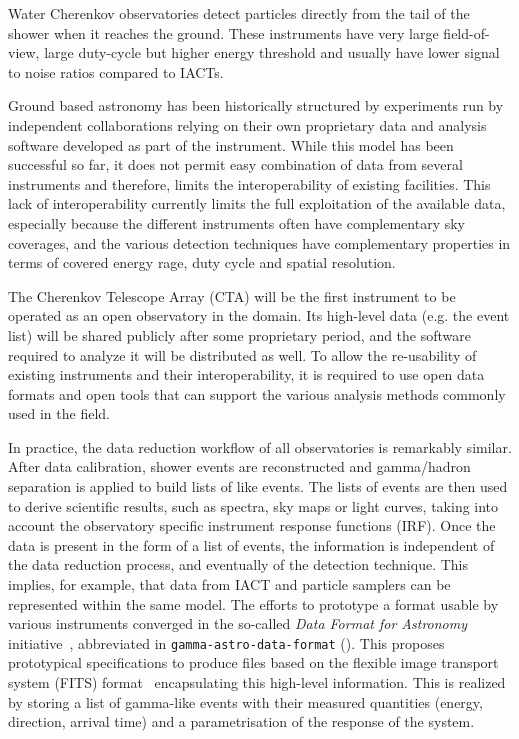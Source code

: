 \documentclass[traditabstract, longauth]{aa}
\begin{document}
Water Cherenkov observatories detect particles directly from the tail of the
shower when it reaches the ground. These instruments have very
large field-of-view, large duty-cycle but higher energy threshold and
usually have lower signal to noise ratios compared to IACTs.

Ground based \gammaray astronomy has been historically structured
by experiments run by independent collaborations relying
on their own proprietary data and analysis software developed as part of the
instrument. While this model has been successful so far, it does not
permit easy combination of data from several instruments and therefore,
limits the interoperability of existing facilities. This lack of
interoperability currently limits the full exploitation of the
available \gammaray data, especially because the different instruments often have
complementary sky coverages, and the various detection
techniques have complementary properties in terms of covered energy rage,
duty cycle and spatial resolution.

The Cherenkov Telescope Array (CTA) will be the first instrument to be operated
as an open observatory in the domain. Its high-level data (e.g. the event list) will be shared publicly after
some proprietary period, and the software required to analyze it will be distributed
as well. To allow the re-usability of existing instruments and their interoperability,
it is required to use open data formats and open tools that can support the various analysis methods
commonly used in the field.


In practice, the data reduction workflow of all \gammaray observatories
is remarkably similar. After data calibration, shower events are reconstructed and
gamma/hadron separation is applied to build lists of \gammaray like events.
The lists of \gammaray events are then used to derive scientific results, such as spectra, sky maps
or light curves, taking into account the observatory specific instrument response functions (IRF).
Once the data is present in the form of a list of events, the information is independent of
the data reduction process, and eventually of the detection technique. This implies,
for example, that data from IACT and particle samplers can be represented
within the same model. The efforts to prototype a format usable by various instruments
converged in the so-called \textit{Data Format for \gammaray Astronomy}
initiative~\citep{gadf_proc, gadf_universe}, abbreviated in
\texttt{gamma-astro-data-format} (\gadf). This proposes prototypical
specifications to produce files based on the flexible image transport system
(FITS) format~\citep{fits} encapsulating this high-level information. This is
realized by storing a list of gamma-like events with their measured quantities
(energy, direction, arrival time) and a parametrisation of the response of the
system.
\end{document}
